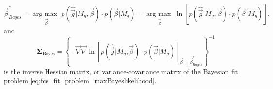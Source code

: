 \documentclass[a4paper,notitlepage]{article}
\DeclareMathOperator*{\argmax}{arg\:max\ }
\newcommand{\mat}[1]{\mathrm{\mathbf{#1}}}
\begin{document}
\begin{equation}\label{eq:fcs_fit_problem_maxBayeslikelihood}
  \vec{\beta}_{Bayes}^\ast=\argmax\limits_{\vec{\beta}}p(\hat{\vec{g}}|M_g,\vec{\beta})\cdot p(\vec{\beta}|M_g)=\argmax\limits_{\vec{\beta}}\ln\left[p(\hat{\vec{g}}|M_g,\vec{\beta})\cdot p(\vec{\beta}|M_g)\right],
\end{equation}
and 
\begin{equation}\label{eq:fcs_fit_problem_invbayeshessian}
  \mat{\Sigma}_\text{Bayes}=\left\{-\vec{\nabla}\vec{\nabla}\ln\left[p(\hat{\vec{g}}|M_g,\vec{\beta})\cdot p(\vec{\beta}|M_g)\right]_{\vec{\beta}=\vec{\beta}_{Bayes}^\ast}\right\}^{-1}
\end{equation}
is the inverse Hessian matrix, or variance-covariance matrix of the Bayesian fit problem \eqref{eq:fcs_fit_problem_maxBayeslikelihood}. 
\end{document}
